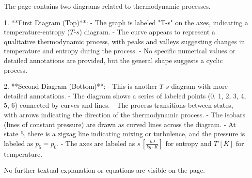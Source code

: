 The page contains two diagrams related to thermodynamic processes.  

1. **First Diagram (Top)**:  
   - The graph is labeled "T-s" on the axes, indicating a temperature-entropy (\( T \)-\( s \)) diagram.  
   - The curve appears to represent a qualitative thermodynamic process, with peaks and valleys suggesting changes in temperature and entropy during the process.  
   - No specific numerical values or detailed annotations are provided, but the general shape suggests a cyclic process.  

2. **Second Diagram (Bottom)**:  
   - This is another \( T \)-\( s \) diagram with more detailed annotations.  
   - The diagram shows a series of labeled points (0, 1, 2, 3, 4, 5, 6) connected by curves and lines.  
   - The process transitions between states, with arrows indicating the direction of the thermodynamic process.  
   - The isobars (lines of constant pressure) are drawn as curved lines across the diagram.  
   - At state 5, there is a zigzag line indicating mixing or turbulence, and the pressure is labeled as \( p_5 = p_0 \).  
   - The axes are labeled as \( s \, [\frac{kJ}{kg \cdot K}] \) for entropy and \( T \, [K] \) for temperature.  

No further textual explanation or equations are visible on the page.